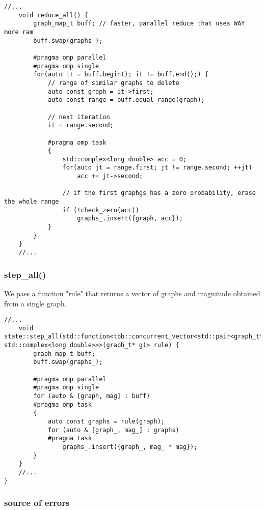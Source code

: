 \documentclass[11pt]{article}
\begin{document}
\begin{lstlisting}[style=CStyle]
	//...
	void reduce_all() {
		graph_map_t buff; // faster, parallel reduce that uses WAY more ram
		buff.swap(graphs_);

		#pragma omp parallel
		#pragma omp single
	    for(auto it = buff.begin(); it != buff.end();) {
	    	// range of similar graphs to delete
	    	auto const graph = it->first;
	    	auto const range = buff.equal_range(graph);

	    	// next iteration
	    	it = range.second;

	    	#pragma omp task
	    	{
	    		std::complex<long double> acc = 0;
	    		for(auto jt = range.first; jt != range.second; ++jt)
	        		acc += jt->second;

		    	// if the first graphgs has a zero probability, erase the whole range
		    	if (!check_zero(acc))
		    		graphs_.insert({graph, acc});
	    	}
	    }
	}
	//...
\end{lstlisting}

\subsubsection{step\_all()}

We pass a function "rule" that returns a vector of graphs and magnitude obtained from a single graph.

\begin{lstlisting}[style=CStyle]
	//...
	void state::step_all(std::function<tbb::concurrent_vector<std::pair<graph_t*, std::complex<long double>>>(graph_t* g)> rule) {
		graph_map_t buff;
		buff.swap(graphs_);

		#pragma omp parallel
		#pragma omp single
		for (auto & [graph, mag] : buff)
		#pragma omp task
		{
			auto const graphs = rule(graph);
			for (auto & [graph_, mag_] : graphs)
			#pragma task
	  			graphs_.insert({graph_, mag_ * mag});
		}
	}
	//...
}
\end{lstlisting}

\subsubsection{source of errors}
\end{document}
